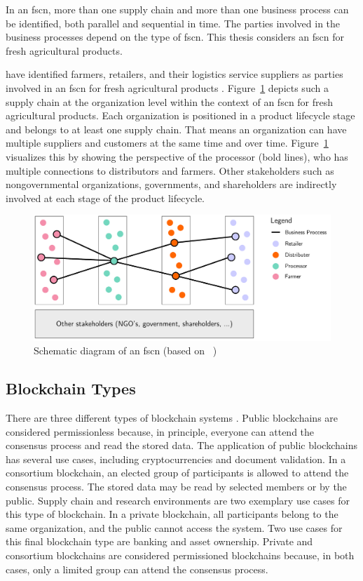 \documentclass[conference]{IEEEtran}
\begin{document}
In an \ac{fscn}, more than one supply chain and more than one business process can be identified, both parallel and sequential in time. The parties involved in the business processes depend on the type of \ac{fscn}. This thesis considers an \ac{fscn} for fresh agricultural products.  

\citeauthor{van2005innovations} have identified farmers, retailers, and their logistics service suppliers as parties involved in an \ac{fscn} for fresh agricultural products \cite{van2005innovations}. Figure~\ref{fig:food_supply_network} depicts such a supply chain at the organization level within the context of an \ac{fscn} for fresh agricultural products. Each organization is positioned in a product lifecycle stage and belongs to at least one supply chain. That means an organization can have multiple suppliers and customers at the same time and over time. Figure~\ref{fig:food_supply_network} visualizes this by showing the perspective of the processor (bold lines), who has multiple connections to distributors and farmers. Other stakeholders such as nongovernmental organizations, governments, and shareholders are indirectly involved at each stage of the product lifecycle.

\begin{figure}[ht]
    \centering
    \includegraphics[page=1,scale=0.23]{fscn}
	\caption{Schematic diagram of an \ac{fscn} (based on \citeauthor{van2005innovations}~\cite{van2005innovations})}
	\label{fig:food_supply_network}
\end{figure}

\subsection{Blockchain Types} \label{s:blockchain_types}
There are three different types of blockchain systems \cite{zheng2017overview}. Public blockchains are considered permissionless because, in principle, everyone can attend the consensus process and read the stored data. The application of public blockchains has several use cases, including cryptocurrencies and document validation. In a consortium blockchain, an elected group of participants is allowed to attend the consensus process. The stored data may be read by selected members or by the public. Supply chain and research environments are two exemplary use cases for this type of blockchain. In a private blockchain, all participants belong to the same organization, and the public cannot access the system. Two use cases for this final blockchain type are banking and asset ownership. Private and consortium blockchains are considered permissioned blockchains because, in both cases, only a limited group can attend the consensus process.
\end{document}
